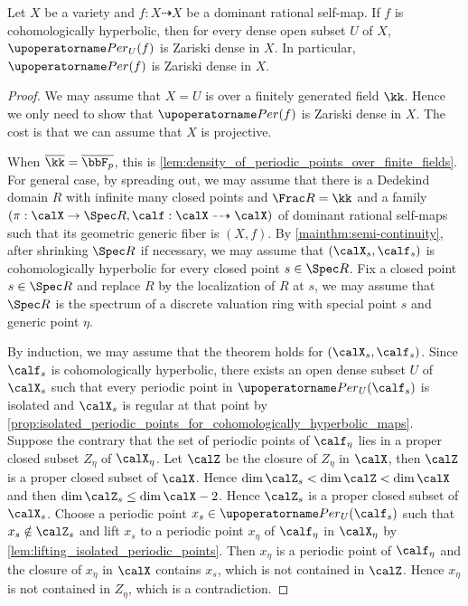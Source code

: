 \begin{theorem}\label{thm:density_of_periodic_points_for_cohomologically_hyperbolic_maps}
	Let $X$ be a variety and $f: X \dashrightarrow X$ be a dominant rational self-map.
	If $f$ is cohomologically hyperbolic, then for every dense open subset $U$ of $X$, $\Per_U(f)$ is Zariski dense in $X$.
	In particular, $\Per(f)$ is Zariski dense in $X$.
\end{theorem}
\begin{proof}
	We may assume that $X = U$ is over a finitely generated field $\kk$.
	Hence we only need to show that $\Per(f)$ is Zariski dense in $X$.
	The cost is that we can assume that $X$ is projective.

	When $\overline{\kk} = \overline{\bbF_p}$, this is \cref{lem:density_of_periodic_points_over_finite_fields}.
	For general case, by spreading out, we may assume that there is a Dedekind domain $R$ with infinite many closed points and $\Frac R = \kk$ and a family $(\pi: \calX \to \Spec R, \calf:\calX \dashrightarrow \calX)$ of dominant rational self-maps such that its geometric generic fiber is $(X,f)$.
	By \cref{mainthm:semi-continuity}, after shrinking $\Spec R$ if necessary, we may assume that $(\calX_s, \calf_s)$ is cohomologically hyperbolic for every closed point $s \in \Spec R$.
	Fix a closed point $s \in \Spec R$ and replace $R$ by the localization of $R$ at $s$, we may assume that $\Spec R$ is the spectrum of a discrete valuation ring with special point $s$ and generic point $\eta$.

	By induction, we may assume that the theorem holds for $(\calX_s, \calf_s)$.
	Since $\calf_s$ is cohomologically hyperbolic, there exists an open dense subset $U$ of $\calX_s$ such that every periodic point in $\Per_U(\calf_s)$ is isolated and $\calX_s$ is regular at that point by \cref{prop:isolated_periodic_points_for_cohomologically_hyperbolic_maps}.
	Suppose the contrary that the set of periodic points of $\calf_\eta$ lies in a proper closed subset $Z_\eta$ of $\calX_\eta$.
	Let $\calZ$ be the closure of $Z_\eta$ in $\calX$, then $\calZ$ is a proper closed subset of $\calX$.
	Hence $\dim \calZ_s < \dim \calZ < \dim \calX$ and then $\dim \calZ_s \leq \dim \calX - 2$.
	Hence $\calZ_s$ is a proper closed subset of $\calX_s$.
	Choose a periodic point $x_s \in \Per_U(\calf_s)$ such that $x_s \notin \calZ_s$ and lift $x_s$ to a periodic point $x_\eta$ of $\calf_\eta$ in $\calX_\eta$ by \cref{lem:lifting_isolated_periodic_points}.
	Then $x_\eta$ is a periodic point of $\calf_\eta$ and the closure of $x_\eta$ in $\calX$ contains $x_s$, which is not contained in $\calZ$.
	Hence $x_\eta$ is not contained in $Z_\eta$, which is a contradiction.
\end{proof}
